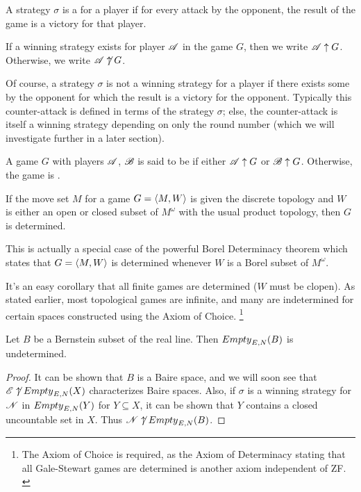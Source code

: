 \begin{defn}
  A strategy $\sigma$ is a  for a player if for
  every attack by the opponent, the result of the game is a victory 
  for that player.

  If a winning strategy exists for player $\mathscr{A}$ in the game $G$, then we
  write $\mathscr{A} \uparrow G$. Otherwise, we write $\mathscr{A} \not\uparrow G$.
\end{defn}

Of course, a strategy $\sigma$ is not a winning strategy for a player if there 
exists some  by the opponent for which the result is 
a victory for the opponent. Typically this counter-attack is defined in
terms of the strategy $\sigma$; else, the counter-attack is itself a
winning strategy depending on only the round number (which we will
investigate further in a later section).

\begin{defn}
  A game $G$ with players $\mathscr{A}$, $\mathscr{B}$ is said to be 
  if either $\mathscr{A} \uparrow G$ or $\mathscr{B} \uparrow G$.
  Otherwise, the game is .
\end{defn}

\begin{thm}\cite{gale}
  If the move set $M$ for a game $G=\langle M,W\rangle$ is given the discrete topology
  and $W$ is either an open or closed subset of $M^\omega$ with the
  usual product topology, then $G$ is determined.
\end{thm}

This is actually a special case of the powerful Borel Determinacy theorem 
which states that $G=\langle M,W\rangle$ is determined whenever $W$ is a Borel subset
of $M^\omega$. \cite{martin}

It's an easy corollary that all finite games are determined
($W$ must be clopen). As stated earlier, most topological games are infinite,
and many are indetermined for certain spaces constructed using the Axiom of
Choice.
\footnote{
  The Axiom of Choice is required, as the Axiom of Determinacy stating
  that all Gale-Stewart games are determined is another axiom independent
  of ZF. \cite{MR0140430}
}

\begin{ex}
  Let $B$ be a Bernstein subset of the real line. Then ${Empty}_{E,N}(B)$ is
  undetermined.
\end{ex}

\begin{proof}
  It can be shown that $B$ is a Baire space, and we will soon see that 
  $\mathscr{E}\not\uparrow {Empty}_{E,N}(X)$ characterizes Baire spaces. Also, if $\sigma$
  is a winning strategy for $\mathscr{N}$ in ${Empty}_{E,N}(Y)$ for $Y\subseteq X$, it can 
  be shown that $Y$ contains a closed uncountable set in $X$. 
  Thus $\mathscr{N}\not\uparrow {Empty}_{E,N}(B)$.
\end{proof}


